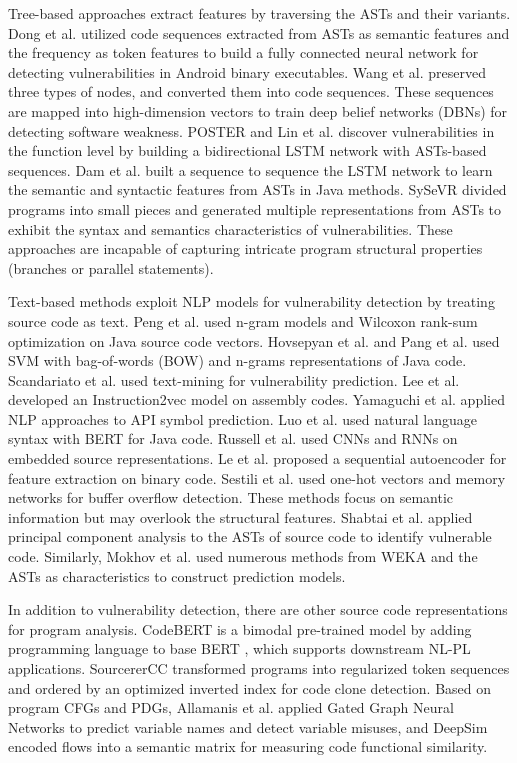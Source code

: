Tree-based approaches extract features by traversing the ASTs and their variants. Dong et al. \cite{dong2018defect} utilized code sequences extracted from ASTs as semantic features and the frequency as token features to build a fully connected neural network for detecting vulnerabilities in Android binary executables. Wang et al. \cite{wang2016} preserved three types of nodes, and converted them into code sequences. These sequences are mapped into high-dimension vectors to train deep belief networks (DBNs) for detecting software weakness. POSTER \cite{lin2017} and Lin et al. \cite{lin2018cross} discover vulnerabilities in the function level by building a bidirectional LSTM network with ASTs-based sequences. Dam et al. \cite{dam2017automatic} built a sequence to sequence the LSTM network to learn the semantic and syntactic features from ASTs in Java methods. SySeVR \cite{li2021sysevr} divided programs into small pieces and generated multiple representations from ASTs to exhibit the syntax and semantics characteristics of vulnerabilities. These approaches are incapable of capturing intricate program structural properties (branches or parallel statements).


Text-based methods exploit NLP models for vulnerability detection by treating source code as text. Peng et al. \cite{peng2015building} used n-gram models and Wilcoxon rank-sum optimization on Java source code vectors. Hovsepyan et al. \cite{hovsepyan2012} and Pang et al. \cite{pang2015} used SVM with bag-of-words (BOW) and n-grams representations of Java code. Scandariato et al. \cite{scandariato2014} used text-mining for vulnerability prediction. Lee et al. \cite{lee2017learning} developed an Instruction2vec model on assembly codes. Yamaguchi et al. \cite{yamaguchi2011} applied NLP approaches to API symbol prediction. Luo et al. \cite{luo2022Journal} used natural language syntax with BERT for Java code. Russell et al. \cite{Russell2018} used CNNs and RNNs on embedded source representations. Le et al. \cite{le2018maximal} proposed a sequential autoencoder for feature extraction on binary code. Sestili et al. \cite{sestili2018towards} used one-hot vectors and memory networks for buffer overflow detection. These methods focus on semantic information but may overlook the structural features. Shabtai et al. \cite{shabtai2009} applied principal component analysis to the ASTs of source code to identify vulnerable code. Similarly, Mokhov et al. \cite{mokhov2015} used numerous methods from WEKA \cite{holmes1994weka} and the ASTs as characteristics to construct prediction models.

In addition to vulnerability detection, there are other source code representations for program analysis. CodeBERT \cite{feng2020codebert} is a bimodal pre-trained model by adding programming language to base BERT \cite{Devlin2018}, which supports downstream NL-PL applications. SourcererCC \cite{sajnani2016sourcerercc} transformed programs into regularized token sequences and ordered by an optimized inverted index for code clone detection. Based on program CFGs and PDGs, Allamanis et al. \cite{allamanis2017learning} applied Gated Graph Neural Networks to predict variable names and detect variable misuses, and DeepSim \cite{zhao2018deepsim} encoded flows into a semantic matrix for measuring code functional similarity.